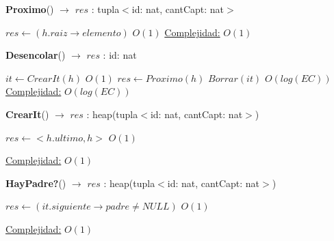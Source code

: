 \begin{Algoritmos}
\begin{algorithm}[H]{\textbf{Proximo}() $\to$ $res$ : tupla$<$id: nat, cantCapt: nat$>$}
    	\begin{algorithmic}[1]
    		 \State $res \gets (h.raiz \rightarrow elemento)$ \Comment $O(1)$
    		 \medskip
			\Statex \underline{Complejidad:} $O(1)$
    	\end{algorithmic}
\end{algorithm}

\begin{algorithm}[H]{\textbf{Desencolar}() $\to$ $res$ : id: nat}
    	\begin{algorithmic}[1]
    		 \State $it \gets CrearIt(h)$ \Comment $O(1)$
		     \State $res \gets Proximo(h)$    		 
    		 \State $Borrar(it)$ \Comment $O(log(EC))$
    		 \medskip
			\Statex \underline{Complejidad:} $O(log(EC))$
    	\end{algorithmic}
\end{algorithm}

\end{Algoritmos}

\begin{Algoritmos}


\begin{algorithm}[H]{\textbf{CrearIt}() $\to$ $res$ : heap(tupla$<$id: nat, cantCapt: nat$>$)}
    	\begin{algorithmic}[1]
			 \State $res \gets  <h.ultimo, h> $ \Comment $O(1)$

			\medskip
			\Statex \underline{Complejidad:} $O(1)$
    	\end{algorithmic}
\end{algorithm}

\begin{algorithm}[H]{\textbf{HayPadre?}() $\to$ $res$ : heap(tupla$<$id: nat, cantCapt: nat$>$)}
    	\begin{algorithmic}[1]
			 \State $res \gets  (it.siguiente \rightarrow padre \not= NULL) $ \Comment $O(1)$

			\medskip
			\Statex \underline{Complejidad:} $O(1)$
    	\end{algorithmic}
\end{algorithm}

\end{Algoritmos}
